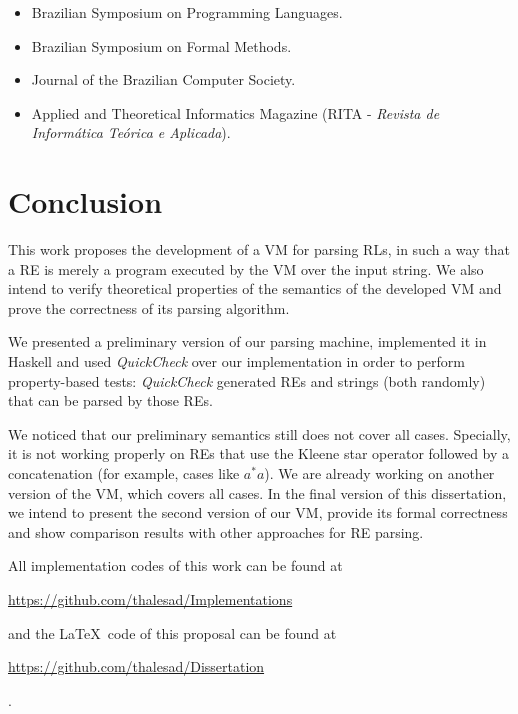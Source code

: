 \documentclass[oneside,12pt]{scrbook}
\theoremstyle{definition}
\theoremstyle{plain}
\theoremstyle{definition}
\begin{document}
\begin{itemize}
	\item Brazilian Symposium on Programming Languages.
	\item Brazilian Symposium on Formal Methods.
	\item Journal of the Brazilian Computer Society.
	\item Applied and Theoretical Informatics Magazine (RITA - \textit{Revista de Informática Teórica e Aplicada}).
\end{itemize}





\chapter{Conclusion}\label{chapter:conclusion}

This work proposes the development of a VM for parsing RLs, in such a way that a RE is merely a program executed by the VM over the input string. We also intend to verify theoretical properties of the semantics of the developed VM and prove the correctness of its parsing algorithm. 

We presented a preliminary version of our parsing machine, implemented it in Haskell and used \textit{QuickCheck} over our implementation in order to perform property-based tests: \textit{QuickCheck} generated REs and strings (both randomly) that can be parsed by those REs.

We noticed that our preliminary semantics still does not cover all cases. Specially, it is not working properly on REs that use the Kleene star operator followed by a concatenation (for example, cases like $a^*a$). We are already working on another version of the VM, which covers  all cases. In the final version of this dissertation, we intend to present the second version of our VM, provide its formal correctness and show comparison results with other approaches for RE parsing.

All implementation codes of this work can be found at \begin{center}\url{https://github.com/thalesad/Implementations}\end{center} and the \LaTeX\ code of this proposal can be found at \begin{center} \url{https://github.com/thalesad/Dissertation} \end{center}.
\end{document}
